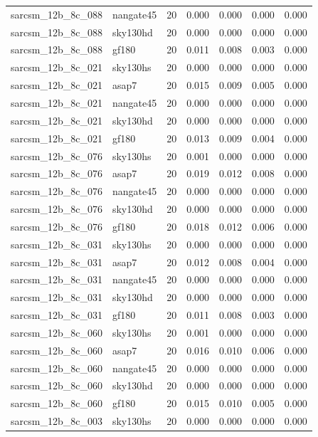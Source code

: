 \begin{tabular}{llrrrrr}
sarcsm\_12b\_8c\_088 & nangate45 & 20 & 0.000 & 0.000 & 0.000 & 0.000 \\
sarcsm\_12b\_8c\_088 & sky130hd & 20 & 0.000 & 0.000 & 0.000 & 0.000 \\
sarcsm\_12b\_8c\_088 & gf180 & 20 & 0.011 & 0.008 & 0.003 & 0.000 \\
sarcsm\_12b\_8c\_021 & sky130hs & 20 & 0.000 & 0.000 & 0.000 & 0.000 \\
sarcsm\_12b\_8c\_021 & asap7 & 20 & 0.015 & 0.009 & 0.005 & 0.000 \\
sarcsm\_12b\_8c\_021 & nangate45 & 20 & 0.000 & 0.000 & 0.000 & 0.000 \\
sarcsm\_12b\_8c\_021 & sky130hd & 20 & 0.000 & 0.000 & 0.000 & 0.000 \\
sarcsm\_12b\_8c\_021 & gf180 & 20 & 0.013 & 0.009 & 0.004 & 0.000 \\
sarcsm\_12b\_8c\_076 & sky130hs & 20 & 0.001 & 0.000 & 0.000 & 0.000 \\
sarcsm\_12b\_8c\_076 & asap7 & 20 & 0.019 & 0.012 & 0.008 & 0.000 \\
sarcsm\_12b\_8c\_076 & nangate45 & 20 & 0.000 & 0.000 & 0.000 & 0.000 \\
sarcsm\_12b\_8c\_076 & sky130hd & 20 & 0.000 & 0.000 & 0.000 & 0.000 \\
sarcsm\_12b\_8c\_076 & gf180 & 20 & 0.018 & 0.012 & 0.006 & 0.000 \\
sarcsm\_12b\_8c\_031 & sky130hs & 20 & 0.000 & 0.000 & 0.000 & 0.000 \\
sarcsm\_12b\_8c\_031 & asap7 & 20 & 0.012 & 0.008 & 0.004 & 0.000 \\
sarcsm\_12b\_8c\_031 & nangate45 & 20 & 0.000 & 0.000 & 0.000 & 0.000 \\
sarcsm\_12b\_8c\_031 & sky130hd & 20 & 0.000 & 0.000 & 0.000 & 0.000 \\
sarcsm\_12b\_8c\_031 & gf180 & 20 & 0.011 & 0.008 & 0.003 & 0.000 \\
sarcsm\_12b\_8c\_060 & sky130hs & 20 & 0.001 & 0.000 & 0.000 & 0.000 \\
sarcsm\_12b\_8c\_060 & asap7 & 20 & 0.016 & 0.010 & 0.006 & 0.000 \\
sarcsm\_12b\_8c\_060 & nangate45 & 20 & 0.000 & 0.000 & 0.000 & 0.000 \\
sarcsm\_12b\_8c\_060 & sky130hd & 20 & 0.000 & 0.000 & 0.000 & 0.000 \\
sarcsm\_12b\_8c\_060 & gf180 & 20 & 0.015 & 0.010 & 0.005 & 0.000 \\
sarcsm\_12b\_8c\_003 & sky130hs & 20 & 0.000 & 0.000 & 0.000 & 0.000 \\

\end{tabular}
